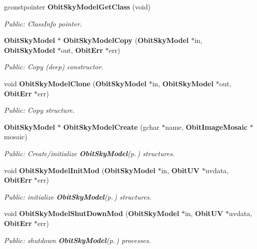 \begin{CompactItemize}
gconstpointer {\bf Obit\-Sky\-Model\-Get\-Class} (void)
\begin{CompactList}\small\item\em Public: Class\-Info pointer. \item\end{CompactList}\item 
{\bf Obit\-Sky\-Model} $\ast$ {\bf Obit\-Sky\-Model\-Copy} ({\bf Obit\-Sky\-Model} $\ast$in, {\bf Obit\-Sky\-Model} $\ast$out, {\bf Obit\-Err} $\ast$err)
\begin{CompactList}\small\item\em Public: Copy (deep) constructor. \item\end{CompactList}\item 
void {\bf Obit\-Sky\-Model\-Clone} ({\bf Obit\-Sky\-Model} $\ast$in, {\bf Obit\-Sky\-Model} $\ast$out, {\bf Obit\-Err} $\ast$err)
\begin{CompactList}\small\item\em Public: Copy structure. \item\end{CompactList}\item 
{\bf Obit\-Sky\-Model} $\ast$ {\bf Obit\-Sky\-Model\-Create} (gchar $\ast$name, {\bf Obit\-Image\-Mosaic} $\ast$mosaic)
\begin{CompactList}\small\item\em Public: Create/initialize {\bf Obit\-Sky\-Model}{\rm (p.\,\pageref{structObitSkyModel})} structures. \item\end{CompactList}\item 
void {\bf Obit\-Sky\-Model\-Init\-Mod} ({\bf Obit\-Sky\-Model} $\ast$in, {\bf Obit\-UV} $\ast$uvdata, {\bf Obit\-Err} $\ast$err)
\begin{CompactList}\small\item\em Public: initialize {\bf Obit\-Sky\-Model}{\rm (p.\,\pageref{structObitSkyModel})} structures. \item\end{CompactList}\item 
void {\bf Obit\-Sky\-Model\-Shut\-Down\-Mod} ({\bf Obit\-Sky\-Model} $\ast$in, {\bf Obit\-UV} $\ast$uvdata, {\bf Obit\-Err} $\ast$err)
\begin{CompactList}\small\item\em Public: shutdown {\bf Obit\-Sky\-Model}{\rm (p.\,\pageref{structObitSkyModel})} processes. \item\end{CompactList}\item 

\end{CompactItemize}
